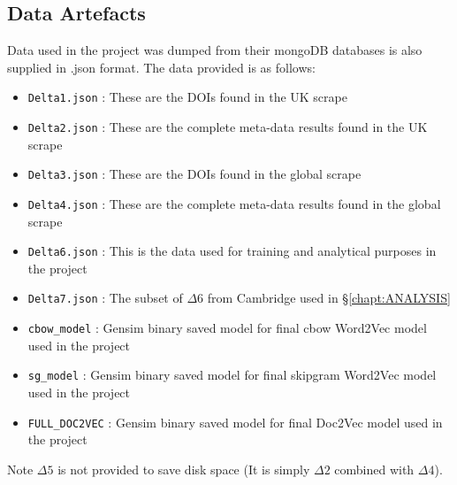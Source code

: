 \subsection{Data Artefacts}
Data used in the project was dumped from their mongoDB databases is also supplied in .json format. The data provided is as follows:
\begin{itemize}
\itemsep-.6em
\item \texttt{Delta1.json} : These are the DOIs found in the UK scrape
\item \texttt{Delta2.json} : These are the complete meta-data results found in the UK scrape
\item \texttt{Delta3.json} : These are the DOIs found in the global scrape
\item \texttt{Delta4.json} : These are the complete meta-data results found in the global scrape
\item \texttt{Delta6.json} : This is the data used for training and analytical purposes in the project
\item \texttt{Delta7.json} : The subset of $\Delta6$ from Cambridge used in \S\ref{chapt:ANALYSIS}
\item \texttt{cbow\_model} : Gensim binary saved model for final cbow Word2Vec model used in the project
\item \texttt{sg\_model} : Gensim binary saved model for final skipgram Word2Vec model used in the project
\item \texttt{FULL\_DOC2VEC} : Gensim binary saved model for final Doc2Vec model used in the project
\end{itemize}
Note $\Delta5$ is not provided to save disk space (It is simply $\Delta2$ combined with $\Delta4$).